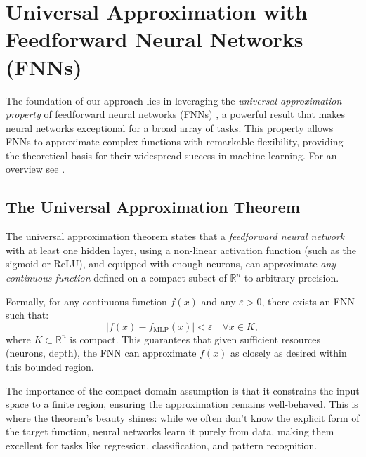\documentclass{article}
\theoremstyle{definition} \newtheorem{definition}{Definition}
\theoremstyle{remark} \newtheorem{remark}{Remark}
\newcounter{ct}
\begin{document}
\newpage





\newpage
\appendix 

\section{Universal Approximation with Feedforward Neural Networks (FNNs)}\label{sec:uniapproxffn}
The foundation of our approach lies in leveraging the \textit{universal approximation property} of feedforward neural networks (FNNs) \citep{poggio1990networks}, a powerful result that makes neural networks exceptional for a broad array of tasks. This property allows FNNs to approximate complex functions with remarkable flexibility, providing the theoretical basis for their widespread success in machine learning.
For an overview see \citep{blum1991approximation,scarselli1998universal,augustine2024survey}.


\subsection{The Universal Approximation Theorem}
The universal approximation theorem states that a \textit{feedforward neural network} with at least one hidden layer, using a non-linear activation function (such as the sigmoid or ReLU), and equipped with enough neurons, can approximate \textit{any continuous function} defined on a compact subset of \(\mathbb{R}^n\) to arbitrary precision.

Formally, for any continuous function \(f(x)\) and any \(\varepsilon > 0\), there exists an FNN such that:
\begin{equation}
| f(x) - f_{\text{MLP}}(x) | < \varepsilon \quad \forall x \in K,
\end{equation}
where \(K \subset \mathbb{R}^n\) is compact. This guarantees that given sufficient resources (neurons, depth), the FNN can approximate \(f(x)\) as closely as desired within this bounded region.

The importance of the compact domain assumption is that it constrains the input space to a finite region, ensuring the approximation remains well-behaved.	
This is where the theorem’s beauty shines: while we often don’t know the explicit form of the target function, neural networks learn it purely from data, making them excellent for tasks like regression, classification, and pattern recognition.
\end{document}
